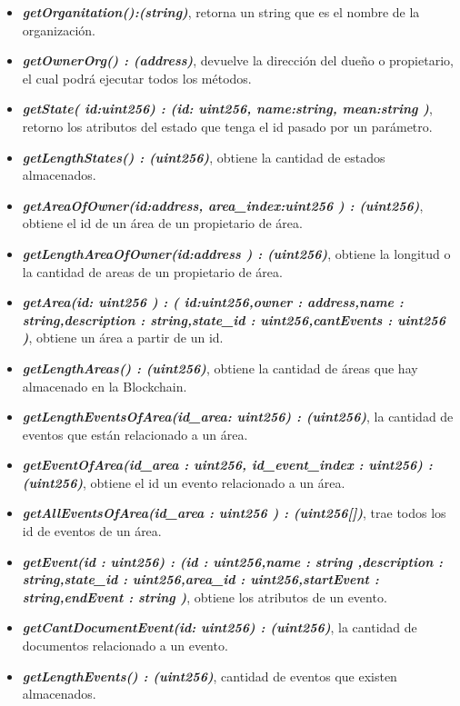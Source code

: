     \begin{itemize}
      \item \textit{\textbf{getOrganitation():(string)}}, retorna un string que es el nombre de la organización.
      \item \textit{\textbf{getOwnerOrg() : (address)}}, devuelve la dirección del dueño o propietario, el cual podrá ejecutar todos los métodos.
      \item \textit{\textbf{getState( id:uint256) : (id: uint256, name:string, mean:string )}}, retorno los atributos del estado que tenga el id pasado por un parámetro.
      \item \textit{\textbf{getLengthStates() : (uint256)}}, obtiene la cantidad de estados almacenados.
      \item \textit{\textbf{getAreaOfOwner(id:address, area\_index:uint256 ) : (uint256)}}, obtiene el id de un área de un propietario de área.
      \item \textit{\textbf{getLengthAreaOfOwner(id:address ) : (uint256)}}, obtiene la longitud o la cantidad de areas de un propietario de área.
      \item \textit{\textbf{getArea(id: uint256 ) : ( id:uint256,owner : address,name : string,description : string,state\_id : uint256,cantEvents : uint256 )}}, obtiene un área a partir de un id.
      \item \textit{\textbf{getLengthAreas() : (uint256)}}, obtiene la cantidad de áreas que hay almacenado en la Blockchain.
      \item \textit{\textbf{getLengthEventsOfArea(id\_area: uint256) : (uint256)}}, la cantidad de eventos que están relacionado a un área.
      \item \textit{\textbf{getEventOfArea(id\_area : uint256, id\_event\_index : uint256)  : (uint256)}}, obtiene el id un evento relacionado a un área.
      \item \textit{\textbf{getAllEventsOfArea(id\_area : uint256 )  : (uint256[])}}, trae todos los id de eventos de un área.
      \item \textit{\textbf{getEvent(id : uint256) : (id : uint256,name : string ,description : string,state\_id : uint256,area\_id : uint256,startEvent : string,endEvent : string )}}, obtiene los atributos de un evento.
      \item \textit{\textbf{getCantDocumentEvent(id: uint256) : (uint256)}},   la cantidad de documentos relacionado a un evento.
      \item \textit{\textbf{getLengthEvents() : (uint256)}}, cantidad de eventos que existen almacenados.

\end{itemize}
